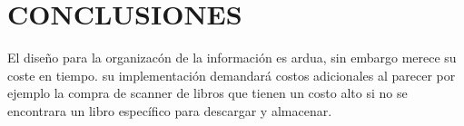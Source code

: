 \chapter*{CONCLUSIONES}
El diseño para la organizacón de la información es ardua, sin embargo merece su coste en tiempo. su implementación demandará costos adicionales al parecer por ejemplo la compra de scanner de libros que tienen un costo alto si no se encontrara un libro específico para descargar y almacenar. 